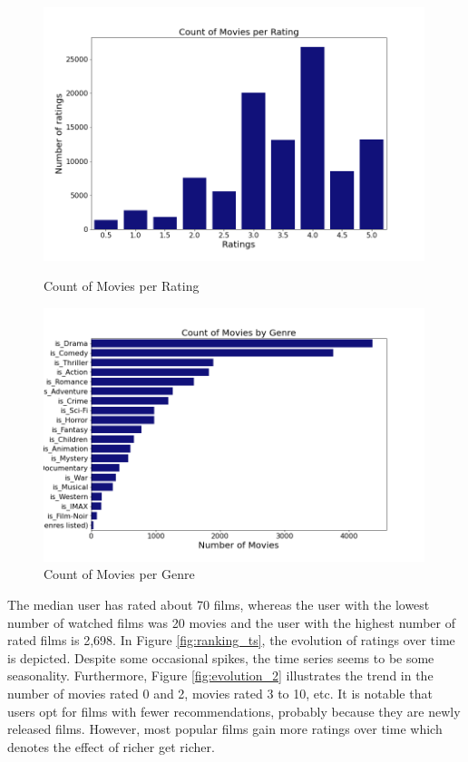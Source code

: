 \documentclass[12pt]{article}
\numberwithin{equation}{section}
\begin{document}
\begin{figure}[h!]
    \begin{minipage}[b]{0.49\linewidth}
         \centering
  	\includegraphics[width=0.99\textwidth]{count_rating.png}
  	\caption{Count of Movies per Rating}
  	\label{fig:count_ranking}
    \end{minipage}
    \hspace{0.01cm}
    \begin{minipage}[b]{0.49\linewidth}
        \centering
  	\includegraphics[width=0.99\textwidth]{count_genre.png}
  	\caption{Count of Movies per Genre}
  	\label{fig:count_genre}
    \end{minipage}
\end{figure}

The median user has rated about 70 films, whereas the user with the lowest number of watched films was 20 movies and the user with the highest number of rated films is 2,698. In Figure \ref{fig:ranking_ts}, the evolution of ratings over time is depicted. Despite some occasional spikes, the time series seems to be some seasonality. Furthermore, Figure \ref{fig:evolution_2} illustrates the trend in the number of movies rated 0 and 2, movies rated 3 to 10, etc. It is notable that users opt for films with fewer recommendations, probably because they are newly released films. However, most popular films gain more ratings over time which denotes the effect of richer get richer.
\end{document}
